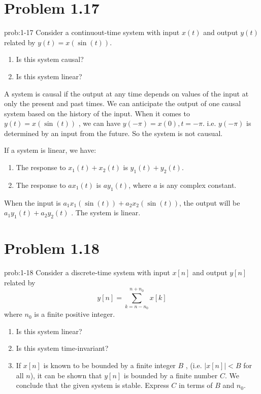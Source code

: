 \documentclass[koma,a4paper,utopia,12pt,listings-color,microtype,paralist,colorlinks,urlcolor=red]{org-article}
\begin{document}
\section{Problem 1.17}
\label{sec:orgff04483}


\begin{prob}[]{prob:1-17}
Consider a continuout-time system with input \(x(t)\) and output \(y(t)\)
related by \(y(t) = x( \sin(t) )\).

\begin{enumerate}
\item Is this system causal?
\item Is this system linear?
\end{enumerate}
\label{prob:1-17}
\end{prob}

A system is causal if the output at any time depends on values of the input at
only the present and past times. We can anticipate the output of one causal
system based on the history of the input. When it comes to \(y(t) = x(\sin(t))\)
, we can have \(y(-\pi) = x(0), t=-\pi\). i.e. \(y(-\pi)\) is determined by
an input from the future. So the system is not causual.

If a system is linear, we have:
\begin{enumerate}
\item The response to \(x_{1}(t) + x_{2}(t)\) is \(y_{1}(t) + y_{2}(t)\).
\item The response to \(ax_{1}(t)\) is \(ay_{1}(t)\), where \(a\) is any complex
constant.
\end{enumerate}

When the input is \(a_{1}x_{1}(\sin(t)) + a_{2}x_{2}(\sin(t))\), the output
will be \(a_{1}y_{1}(t) + a_{2}y_{2}(t)\) . The system is linear.
\section{Problem 1.18}
\label{sec:org2f0d4a2}


\begin{prob}[]{prob:1-18}
Consider a discrete-time system with input \(x[n]\) and output \(y[n]\)
related by
\begin{equation*}
y[n] = \sum_{k=n-n_{0}}^{n+n_{0}} x[k]
\end{equation*}
where \(n_{0}\) is a finite positive integer.
\begin{enumerate}
\item Is this system linear?
\item Is this system time-invariant?
\item If \(x[n]\) is known to be bounded by a finite integer \(B\) , (i.e.
\(|x[n]| < B\) for all \(n\)), it can be shown that \(y[n]\) is bounded
by a finite number \(C\). We conclude that the given system is stable.
Express \(C\) in terms of \(B\) and \(n_{0}\).
\end{enumerate}
\label{prob:1-18}
\end{prob}
\end{document}

